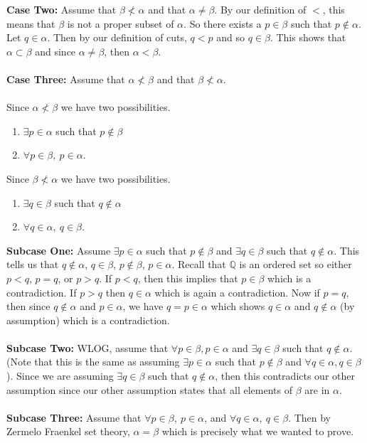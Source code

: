 \documentclass[12pt]{article}
\begin{document}
\textbf{Case Two:} Assume that $\beta \nless \alpha$ and that $\alpha \neq \beta$. By our definition of $<$, this means that $\beta$ is not a proper subset of $\alpha$. So there exists a $p \in \beta$ such that $p \notin \alpha$. Let $q \in \alpha.$ Then by our definition of cuts, $q<p$ and so $q \in \beta$. This shows that $\alpha \subset \beta$ and since $\alpha \neq \beta$, then $\alpha < \beta$.\\ \\
\textbf{Case Three:} Assume that $\alpha \nless \beta$ and that $\beta \nless \alpha$. \\ \\
Since $\alpha \nless \beta$ we have two possibilities.
\begin{enumerate}
\item $\exists p \in \alpha$ such that $p \notin \beta$ 
\item $\forall p \in \beta, ~ p \in \alpha$.
\end{enumerate}
Since  $\beta \nless \alpha$ we have two possibilities.
\begin{enumerate}
\item $\exists q \in \beta$ such that $q \notin \alpha$
\item $\forall q \in \alpha, ~ q \in \beta$.
\end{enumerate}
\textbf{Subcase One:} Assume $\exists p \in \alpha$ such that $p \notin \beta$ and $\exists q \in \beta$ such that $q \notin \alpha$. This tells us that $q \notin \alpha$, $q \in \beta$, $p \notin \beta$, $p \in \alpha$. Recall that $\mathbb{Q}$ is an ordered set so either $p<q$, $p=q$, or $p>q$. If $p<q$, then this implies that $p \in \beta$ which is a contradiction. If $p>q$ then $q \in \alpha$ which is again a contradiction. Now if $p=q$, then since $q \notin \alpha$ and $p \in \alpha$, we have $q=p \in \alpha$ which shows $q \in \alpha$  and $q \notin \alpha$ (by assumption) which is a contradiction. \\ \\ 
\textbf{Subcase Two:} WLOG, assume that $\forall p \in \beta, p \in \alpha$ and $\exists q \in \beta$ such that $q \notin \alpha$. (Note that this is the same as assuming $\exists p \in \alpha$ such that $p \notin \beta$ and $\forall q \in \alpha, q \in \beta$). Since we are assuming $\exists q \in \beta$ such that $q \notin \alpha$, then this contradicts our other assumption since our other assumption states that all elements of $\beta$ are in $\alpha$. \\ \\ 
\textbf{Subcase Three:} Assume that $\forall p \in \beta,~ p \in \alpha$, and $\forall q \in \alpha,~ q \in \beta$. Then by Zermelo Fraenkel set theory, $\alpha = \beta$ which is precisely what we wanted to prove. \\ \\ 
\end{document}
